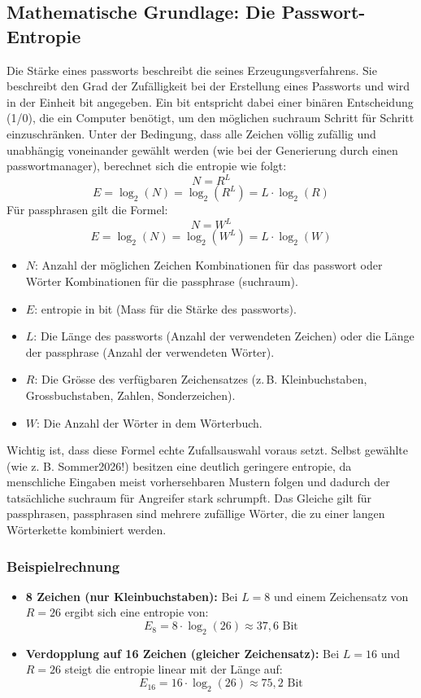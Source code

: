 \documentclass[12pt,a4paper]{article}
\begin{document}
\subsection{Mathematische Grundlage: Die Passwort-Entropie}
\label{subsec:entropie}
Die Stärke eines \gls{passwort}s beschreibt die  seines Erzeugungsverfahrens. Sie beschreibt den Grad der Zufälligkeit bei der Erstellung eines Passworts und wird in der Einheit \gls{bit} angegeben. Ein \gls{bit} entspricht dabei einer binären Entscheidung (1/0), die ein Computer benötigt, um den \mbox{möglichen} \gls{suchraum} Schritt für Schritt \\ einzuschränken. Unter der Bedingung, dass alle Zeichen völlig zufällig und unabhängig voneinander gewählt werden (wie bei der Generierung durch einen \gls{passwortmanager}), berechnet sich die \gls{entropie} wie folgt:    
$$N=R^L$$
$$E = \log_2(N) = \log_2(R^L) = L \cdot \log_2(R)$$
Für \gls{passphrase}n gilt die Formel:
$$N = W^L$$
$$E = \log_2(N) = \log_2(W^L) = L \cdot \log_2(W)$$
\begin{itemize}
    \item $N$: Anzahl der möglichen Zeichen Kombinationen für das \gls{passwort} oder Wörter Kombinationen für die \gls{passphrase} (\gls{suchraum}).
    \item $E$: \gls{entropie} in \gls{bit} (Mass für die Stärke des \gls{passwort}s).
    \item $L$: Die Länge des \gls{passwort}s (Anzahl der verwendeten Zeichen) oder die Länge der \gls{passphrase} (Anzahl der verwendeten Wörter).
    \item $R$: Die Grösse des verfügbaren Zeichensatzes (z.\,B. Kleinbuchstaben, \\ Grossbuchstaben, Zahlen, Sonderzeichen).
    \item $W$: Die Anzahl der Wörter in dem Wörterbuch.
\end{itemize}
Wichtig ist, dass diese Formel echte Zufallsauswahl voraus setzt. Selbst gewählte \\  (wie z. B. Sommer2026!) besitzen eine deutlich geringere \gls{entropie}, da \\ menschliche Eingaben meist vorhersehbaren Mustern folgen und dadurch der tatsächliche \gls{suchraum} für Angreifer stark schrumpft. Das Gleiche gilt für \gls{passphrase}n, \gls{passphrase}n sind mehrere zufällige Wörter, die zu einer langen Wörterkette kombiniert werden. 
\subsubsection{Beispielrechnung}
\begin{itemize}
    \item \textbf{8 Zeichen (nur Kleinbuchstaben):} Bei $L = 8$ und einem Zeichensatz von $R = 26$ ergibt sich eine \gls{entropie} von:
    \[
    E_8 = 8 \cdot \log_2(26) \approx 37{,}6 \text{ Bit}
    \]
    \item \textbf{Verdopplung auf 16 Zeichen (gleicher Zeichensatz):} Bei $L = 16$ und $R = 26$ steigt die \gls{entropie} linear mit der Länge auf:
    \[
    E_{16} = 16 \cdot \log_2(26) \approx 75{,}2 \text{ Bit}
    \]
\end{itemize}
\end{document}
